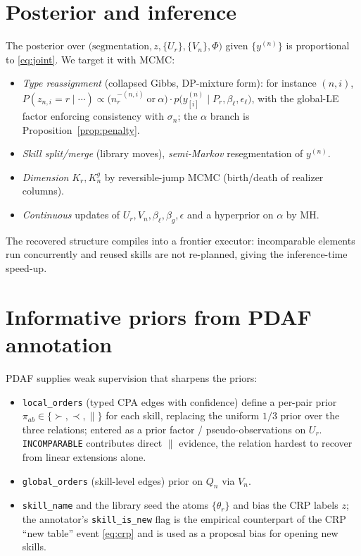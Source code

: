 \documentclass[11pt]{article}
\begin{document}
\section{Posterior and inference}
The posterior over $\big(\text{segmentation},z,\{U_r\},\{V_n\},\Phi\big)$ given $\{y^{(n)}\}$ is
proportional to \eqref{eq:joint}. We target it with MCMC:
\begin{itemize}\setlength\itemsep{1pt}
\item \emph{Type reassignment} (collapsed Gibbs, DP-mixture form): for instance $(n,i)$,
$P(z_{n,i}=r\mid\cdots)\propto \big(n_r^{-(n,i)}\ \text{or}\ \alpha\big)\cdot
p\big(y^{(n)}_{[i]}\mid P_r,\beta_\ell,\epsilon_\ell\big)$, with the global-LE factor enforcing
consistency with $\sigma_n$; the $\alpha$ branch is Proposition~\ref{prop:penalty}.
\item \emph{Skill split/merge} (library moves), \emph{semi-Markov} resegmentation of $y^{(n)}$.
\item \emph{Dimension} $K_r,K^g_n$ by reversible-jump MCMC (birth/death of realizer columns).
\item \emph{Continuous} updates of $U_r,V_n,\beta_\ell,\beta_g,\epsilon$ and a hyperprior on $\alpha$ by MH.
\end{itemize}
The recovered structure compiles into a frontier executor: incomparable elements run concurrently and
reused skills are not re-planned, giving the inference-time speed-up.

\section{Informative priors from PDAF annotation}
PDAF supplies weak supervision that sharpens the priors:
\begin{itemize}\setlength\itemsep{1pt}
\item \texttt{local\_orders} (typed CPA edges with confidence) define a per-pair prior
$\pi_{ab}\in\{\succ,\prec,\parallel\}$ for each skill, replacing the uniform $1/3$ prior over the three
relations; entered as a prior factor / pseudo-observations on $U_r$. \texttt{INCOMPARABLE} contributes
direct $\parallel$ evidence, the relation hardest to recover from linear extensions alone.
\item \texttt{global\_orders} (skill-level edges) prior on $Q_n$ via $V_n$.
\item \texttt{skill\_name} and the library seed the atoms $\{\theta_r\}$ and bias the CRP labels $z$;
the annotator's \texttt{skill\_is\_new} flag is the empirical counterpart of the CRP ``new table'' event
\eqref{eq:crp} and is used as a proposal bias for opening new skills.
\end{itemize}
\end{document}
